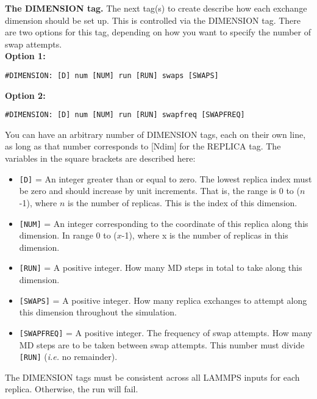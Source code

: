 \documentclass[10pt]{article}
\begin{document}
\textbf{The DIMENSION tag.}
The next tag(s) to create describe how each exchange dimension should be set up. This
is controlled via the DIMENSION tag. There are two options for this tag, depending on
how you want to specify the number of swap attempts.\\
\textbf{Option 1:}
\begin{verbatim}
#DIMENSION: [D] num [NUM] run [RUN] swaps [SWAPS]
\end{verbatim}
\textbf{Option 2:}
\begin{verbatim}
#DIMENSION: [D] num [NUM] run [RUN] swapfreq [SWAPFREQ]
\end{verbatim}
You can have an arbitrary number of DIMENSION tags, each on their own line, as
long as that number corresponds to [Ndim] for the REPLICA tag. 
The variables in the square brackets are described here:
\begin{itemize}
\item	\texttt{[D]} = An integer greater than or equal to zero. The lowest
		replica index must be zero and should increase by unit increments. That is,
		the range is 0 to ($n$-1), where $n$ is the number of replicas. This is
		the index of this dimension.
\item	\texttt{[NUM]} = An integer corresponding to the coordinate of this replica
		along this dimension. In range 0 to ($x$-1), where x is the number of replicas
		in this dimension.
\item	\texttt{[RUN]} = A positive integer. How many MD steps in total to take along
		this dimension.
\item	\texttt{[SWAPS]} = A positive integer. How many replica exchanges to attempt along this
		dimension throughout the simulation.
\item 	\texttt{[SWAPFREQ]} = A positive integer. The frequency of swap attempts. How many MD steps
		are to be taken between swap attempts. This number must divide \texttt{[RUN]} ({\em i.e.} no remainder).
\end{itemize}


The DIMENSION tags must be consistent across all LAMMPS inputs for each replica. Otherwise,
the run will fail.
\end{document}
